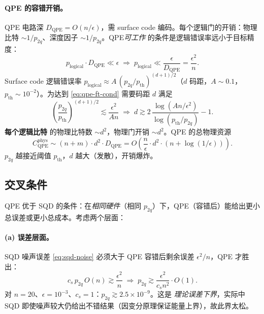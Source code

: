 \documentclass[11pt]{article}
\newcommand{\eps}{\epsilon}
\newcommand{\Oof}[1]{O(#1)}
\begin{document}
\paragraph{QPE 的容错开销。} QPE 电路深 $D_{\mathrm{QPE}}=\Oof{n/\eps}$，需 surface code 编码。每个逻辑门的开销：物理比特 $\sim 1/p_{2q}$、深度因子 $\sim 1/p_{2q}$。QPE\emph{可工作} 的条件是逻辑错误率远小于目标精度：
\begin{equation}\label{eq:qpe-ft-cond}
  p_{\mathrm{logical}}\cdot D_{\mathrm{QPE}} \ll \eps
  \;\Longrightarrow\;
  p_{\mathrm{logical}} \ll \frac{\eps}{D_{\mathrm{QPE}}} = \frac{\eps^2}{n}.
\end{equation}
Surface code 逻辑错误率 $p_{\mathrm{logical}}\approx A\,(p_{2q}/p_{\mathrm{th}})^{(d+1)/2}$（$d$ 码距，$A\sim 0.1$，$p_{\mathrm{th}}\sim 10^{-2}$）。为达到 \eqref{eq:qpe-ft-cond} 需要码距 $d$ 满足
\begin{equation}\label{eq:code-distance}
  \left(\frac{p_{2q}}{p_{\mathrm{th}}}\right)^{(d+1)/2} \lesssim \frac{\eps^2}{A n}
  \;\Longrightarrow\;
  d \gtrsim 2\,\frac{\log(A n/\eps^2)}{\log(p_{\mathrm{th}}/p_{2q})} - 1.
\end{equation}
\textbf{每个逻辑比特} 的物理比特数 $\sim d^2$，物理门开销 $\sim d^2$。QPE 的总物理资源
\begin{equation}\label{eq:qpe-physical}
  C_{\mathrm{QPE}}^{\mathrm{phys}} \sim (n+m)\cdot d^2 \cdot D_{\mathrm{QPE}} = \Oof{\frac{n}{\eps}\cdot d^2\cdot(n+\log(1/\eps))}.
\end{equation}
$p_{2q}$ 越接近阈值 $p_{\mathrm{th}}$，$d$ 越大（发散），开销爆炸。

\subsection{交叉条件}
QPE 优于 SQD 的条件：在\emph{相同硬件}（相同 $p_{2q}$）下，QPE（容错后）能给出更小总误差或更小总成本。考虑两个层面：

\paragraph{(a) 误差层面。} SQD 噪声误差 \eqref{eq:sqd-noise} 必须大于 QPE 容错后剩余误差 $\eps^2/n$，QPE 才胜出：
\begin{equation}\label{eq:cross-err}
  c_s\,p_{2q}\,\Oof{n} \gtrsim \frac{\eps^2}{n}
  \;\Longrightarrow\;
  p_{2q} \gtrsim \frac{\eps^2}{c_s n^2}\cdot\Oof{1}.
\end{equation}
对 $n=20$、$\eps=10^{-3}$、$c_s=1$：$p_{2q}\gtrsim 2.5\times 10^{-9}$。这是 \emph{理论误差下界}，实际中 SQD 即使噪声较大仍给出不错结果（因变分原理保证能量上界），故此界太松。
\end{document}
